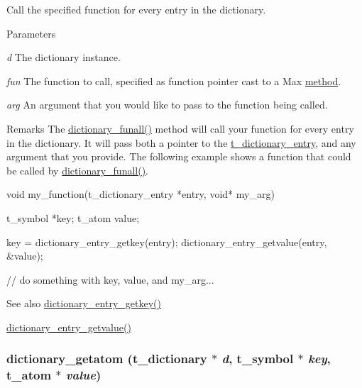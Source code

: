 Call the specified function for every entry in the dictionary. 
\begin{DoxyParams}{Parameters}
\item[{\em d}]The dictionary instance. \item[{\em fun}]The function to call, specified as function pointer cast to a Max \hyperlink{group__datatypes_gac26ba0a173b50597f5738132e059b42d}{method}. \item[{\em arg}]An argument that you would like to pass to the function being called.\end{DoxyParams}
\begin{DoxyRemark}{Remarks}
The \hyperlink{group__dictionary_ga923b67932c8401f58dee86cfb3bb5110}{dictionary\_\-funall()} method will call your function for every entry in the dictionary. It will pass both a pointer to the \hyperlink{structt__dictionary__entry}{t\_\-dictionary\_\-entry}, and any argument that you provide. The following example shows a function that could be called by \hyperlink{group__dictionary_ga923b67932c8401f58dee86cfb3bb5110}{dictionary\_\-funall()}. 
\begin{DoxyCode}
    void my_function(t_dictionary_entry *entry, void* my_arg)
    {
        t_symbol    *key;
        t_atom      value;
        
        key = dictionary_entry_getkey(entry);
        dictionary_entry_getvalue(entry, &value);
        
        // do something with key, value, and my_arg...
    }
\end{DoxyCode}
 
\end{DoxyRemark}
\begin{DoxySeeAlso}{See also}
\hyperlink{group__dictionary_ga866aeb04d26740768790f64203f30b7c}{dictionary\_\-entry\_\-getkey()} 

\hyperlink{group__dictionary_ga55877f4d0fef0a8d0badf9afc95bb7d0}{dictionary\_\-entry\_\-getvalue()} 
\end{DoxySeeAlso}
\hypertarget{group__dictionary_ga28a8378a4710e667a63f8947261bd439}{
\subsubsection[{dictionary\_\-getatom}]{ dictionary\_\-getatom ({\bf t\_\-dictionary} $\ast$ {\em d}, \/  {\bf t\_\-symbol} $\ast$ {\em key}, \/  {\bf t\_\-atom} $\ast$ {\em value})}}
\label{group__dictionary_ga28a8378a4710e667a63f8947261bd439}


